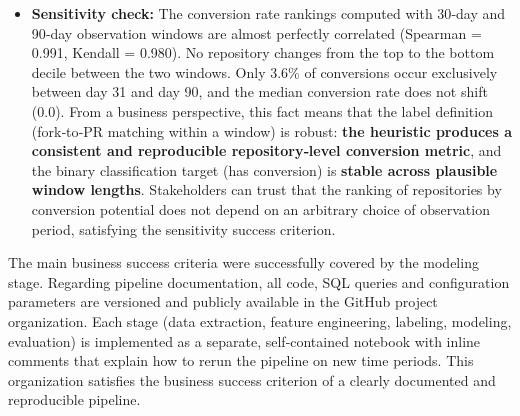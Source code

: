 \begin{itemize}
  From a business perspective, \textbf{repositories with active issue discussions} are the most likely to turn forks into pull requests. For classification (high/low conversion), no other feature matters meaningfully. For estimating the exact conversion rate (regression), watch counts (popularity) and push activity (code churn) also provide non‑negligible signals. Still, issue comments dominate, and the overall explanation remains interpretable: engaged discussions signal a healthy, welcoming community that encourages contributions. This satisfies the business success criterion.
  \item \textbf{Sensitivity check:} The conversion rate rankings computed with 30‑day and 90‑day observation windows are almost perfectly correlated (Spearman = 0.991, Kendall = 0.980). No repository changes from the top to the bottom decile between the two windows. Only 3.6\% of conversions occur exclusively between day 31 and day 90, and the median conversion rate does not shift (0.0). From a business perspective, this fact means that the label definition (fork‑to‑PR matching within a window) is robust: \textbf{the heuristic produces a consistent and reproducible repository‑level conversion metric}, and the binary classification target (has conversion) is \textbf{stable across plausible window lengths}. Stakeholders can trust that the ranking of repositories by conversion potential does not depend on an arbitrary choice of observation period, satisfying the sensitivity success criterion.
\end{itemize}

The main business success criteria were successfully covered by the modeling stage. Regarding pipeline documentation, all code, SQL queries and configuration parameters are versioned and publicly available in the GitHub project organization. Each stage (data extraction, feature engineering, labeling, modeling, evaluation) is implemented as a separate, self‑contained notebook with inline comments that explain how to rerun the pipeline on new time periods. This organization satisfies the business success criterion of a clearly documented and reproducible pipeline.

